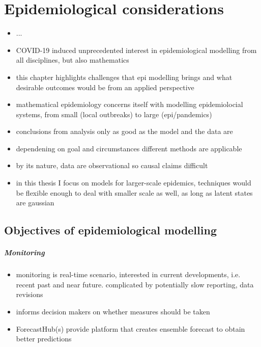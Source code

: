 \glsresetall
\chapter{Epidemiological considerations}
\label{chap:epidemiological_considerations}
\begin{tcolorbox}[title={Contributions of this chapter}]
    \begin{itemize}
        \item ...
    \end{itemize}
\end{tcolorbox}
\newpage

\begin{itemize}
    \item COVID-19 induced unprecedented interest in epidemiological modelling from all disciplines, but also mathematics
    \item this chapter highlights challenges that epi modelling brings and what desirable outcomes would be from an applied perspective
    \item mathematical epidemiology concerns itself with modelling epidemiolocial systems, from small (local outbreaks) to large (epi/pandemics)
    \item conclusions from analysis only as good as the model and the data are
    \item dependening on goal and circumstances different methods are applicable
    \item by its nature, data are observational so causal claims difficult
    \item in this thesis I focus on models for larger-scale epidemics, techniques would be flexible enough to deal with smaller scale as well, as long as latent states are gaussian
\end{itemize}
\section{Objectives of epidemiological modelling}

\paragraph{Monitoring}
\begin{itemize}
    \item monitoring is real-time scenario, interested in current developments, i.e. recent past and near future. complicated by potentially slow reporting, data revisions
    \item informs decision makers on whether measures should be taken
    \item ForecastHub(s) provide platform that creates ensemble forecast to obtain better predictions \cite{Bracher2022National,Bracher2021Preregistered,Ray2020Ensemble,Sherratt2022Predictive}
\end{itemize}
